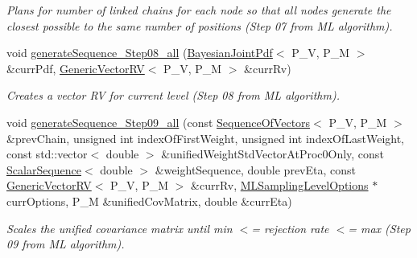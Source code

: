 \begin{DoxyCompactItemize}
\begin{DoxyCompactList}\small\item\em Plans for number of linked chains for each node so that all nodes generate the closest possible to the same number of positions (Step 07 from M\-L algorithm). \end{DoxyCompactList}\item 
void \hyperlink{class_q_u_e_s_o_1_1_m_l_sampling_a754bc11c7802f627fece9f063450739a}{generate\-Sequence\-\_\-\-Step08\-\_\-all} (\hyperlink{class_q_u_e_s_o_1_1_bayesian_joint_pdf}{Bayesian\-Joint\-Pdf}$<$ P\-\_\-\-V, P\-\_\-\-M $>$ \&curr\-Pdf, \hyperlink{class_q_u_e_s_o_1_1_generic_vector_r_v}{Generic\-Vector\-R\-V}$<$ P\-\_\-\-V, P\-\_\-\-M $>$ \&curr\-Rv)
\begin{DoxyCompactList}\small\item\em Creates a vector R\-V for current level (Step 08 from M\-L algorithm). \end{DoxyCompactList}\item 
void \hyperlink{class_q_u_e_s_o_1_1_m_l_sampling_a26892288f3b1902d78ba049b96579a08}{generate\-Sequence\-\_\-\-Step09\-\_\-all} (const \hyperlink{class_q_u_e_s_o_1_1_sequence_of_vectors}{Sequence\-Of\-Vectors}$<$ P\-\_\-\-V, P\-\_\-\-M $>$ \&prev\-Chain, unsigned int index\-Of\-First\-Weight, unsigned int index\-Of\-Last\-Weight, const std\-::vector$<$ double $>$ \&unified\-Weight\-Std\-Vector\-At\-Proc0\-Only, const \hyperlink{class_q_u_e_s_o_1_1_scalar_sequence}{Scalar\-Sequence}$<$ double $>$ \&weight\-Sequence, double prev\-Eta, const \hyperlink{class_q_u_e_s_o_1_1_generic_vector_r_v}{Generic\-Vector\-R\-V}$<$ P\-\_\-\-V, P\-\_\-\-M $>$ \&curr\-Rv, \hyperlink{class_q_u_e_s_o_1_1_m_l_sampling_level_options}{M\-L\-Sampling\-Level\-Options} $\ast$curr\-Options, P\-\_\-\-M \&unified\-Cov\-Matrix, double \&curr\-Eta)
\begin{DoxyCompactList}\small\item\em Scales the unified covariance matrix until min $<$= rejection rate $<$= max (Step 09 from M\-L algorithm). \end{DoxyCompactList}\item 

\end{DoxyCompactItemize}
